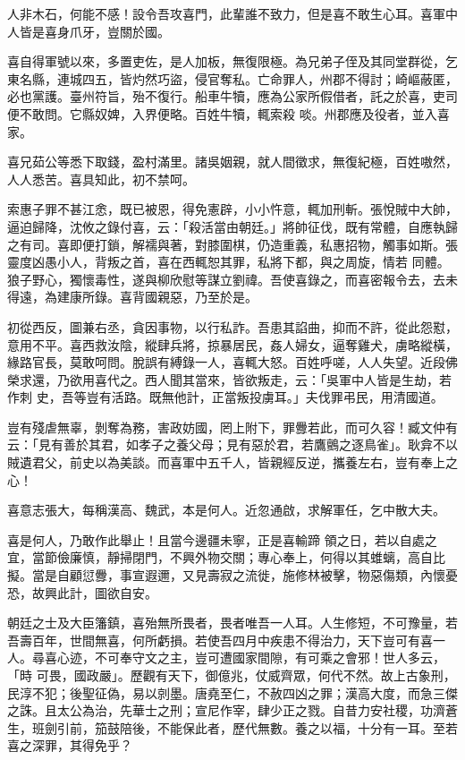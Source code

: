 \begin{pinyinscope}
 人非木石，何能不感！設令吾攻喜門，此輩誰不致力，但是喜不敢生心耳。喜軍中人皆是喜身爪牙，豈關於國。



 喜自得軍號以來，多置吏佐，是人加板，無復限極。為兄弟子侄及其同堂群從，乞東名縣，連城四五，皆灼然巧盜，侵官奪私。亡命罪人，州郡不得討；崎嶇蔽匿，必也黨護。臺州符旨，殆不復行。船車牛犢，應為公家所假借者，託之於喜，吏司便不敢問。它縣奴婢，入界便略。百姓牛犢，輒索殺
 啖。州郡應及役者，並入喜家。



 喜兄茹公等悉下取錢，盈村滿里。諸吳姻親，就人間徵求，無復紀極，百姓嗷然，人人悉苦。喜具知此，初不禁呵。



 索惠子罪不甚江悆，既已被恩，得免憲辟，小小忤意，輒加刑斬。張悅賊中大帥，逼迫歸降，沈攸之錄付喜，云：「殺活當由朝廷。」將帥征伐，既有常體，自應執歸之有司。喜即便打鎖，解襦與著，對膝圍棋，仍造重義，私惠招物，觸事如斯。張靈度凶愚小人，背叛之首，喜在西輒恕其罪，私將下都，與之周旋，情若
 同體。狼子野心，獨懷毒性，遂與柳欣慰等謀立劉禕。吾使喜錄之，而喜密報令去，去未得遠，為建康所錄。喜背國親惡，乃至於是。



 初從西反，圖兼右丞，貪因事物，以行私詐。吾患其諂曲，抑而不許，從此怨懟，意用不平。喜西救汝陰，縱肆兵將，掠暴居民，姦人婦女，逼奪雞犬，虜略縱橫，緣路官長，莫敢呵問。脫誤有縛錄一人，喜輒大怒。百姓呼嗟，人人失望。近段佛榮求還，乃欲用喜代之。西人聞其當來，皆欲叛走，云：「吳軍中人皆是生劫，若作刺
 史，吾等豈有活路。既無他計，正當叛投虜耳。」夫伐罪弔民，用清國道。



 豈有殘虐無辜，剝奪為務，害政妨國，罔上附下，罪釁若此，而可久容！臧文仲有云：「見有善於其君，如孝子之養父母；見有惡於君，若鷹鸇之逐鳥雀」。耿弇不以賊遺君父，前史以為美談。而喜軍中五千人，皆親經反逆，攜養左右，豈有奉上之心！



 喜意志張大，每稱漢高、魏武，本是何人。近忽通啟，求解軍任，乞中散大夫。



 喜是何人，乃敢作此舉止！且當今邊疆未寧，正是喜輸蹄
 領之日，若以自處之宜，當節儉廉慎，靜掃閉門，不興外物交關；專心奉上，何得以其蜼螭，高自比擬。當是自顧愆釁，事宣遐邇，又見壽寂之流徙，施修林被擊，物惡傷類，內懷憂恐，故興此計，圖欲自安。



 朝廷之士及大臣籓鎮，喜殆無所畏者，畏者唯吾一人耳。人生修短，不可豫量，若吾壽百年，世間無喜，何所虧損。若使吾四月中疾患不得治力，天下豈可有喜一人。尋喜心迹，不可奉守文之主，豈可遭國家間隙，有可乘之會邪！世人多云，「時
 可畏，國政嚴」。歷觀有天下，御億兆，仗威齊眾，何代不然。故上古象刑，民淳不犯；後聖征偽，易以剠墨。唐堯至仁，不赦四凶之罪；漢高大度，而急三傑之誅。且太公為治，先華士之刑；宣尼作宰，肆少正之戮。自昔力安社稷，功濟蒼生，班劍引前，笳鼓陪後，不能保此者，歷代無數。養之以福，十分有一耳。至若喜之深罪，其得免乎？




\end{pinyinscope}
